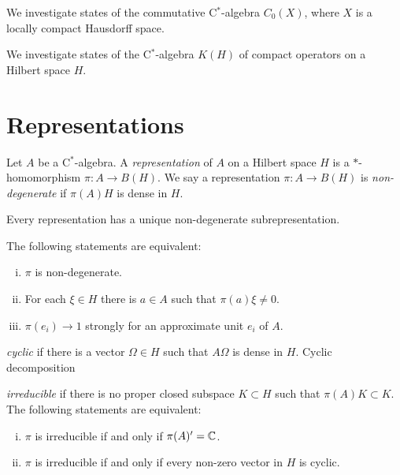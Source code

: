 \documentclass{../../large}
\begin{document}
\begin{prb}
We investigate states of the commutative C$^*$-algebra $C_0(X)$, where $X$ is a locally compact Hausdorff space.
\end{prb}

\begin{prb}
We investigate states of the C$^*$-algebra $K(H)$ of compact operators on a Hilbert space $H$.
\end{prb}

\section{Representations}


\begin{prb}
Let $A$ be a C$^*$-algebra.
A \emph{representation} of $A$ on a Hilbert space $H$ is a $*$-homomorphism $\pi:A\to B(H)$.
We say a representation $\pi:A\to B(H)$ is \emph{non-degenerate} if $\pi(A)H$ is dense in $H$.
\begin{parts}
\item Every representation has a unique non-degenerate subrepresentation.
\item The following statements are equivalent:
\begin{enumerate}[(i)]
\item $\pi$ is non-degenerate.
\item For each $\xi\in H$ there is $a\in A$ such that $\pi(a)\xi\ne0$.
\item $\pi(e_i)\to1$ strongly for an approximate unit $e_i$ of $A$.
\end{enumerate}
\end{parts}
\end{prb}

\begin{prb}
\emph{cyclic} if there is a vector $\Omega\in H$ such that $A\Omega$ is dense in $H$.
Cyclic decomposition
\end{prb}


\begin{prb}
\emph{irreducible} if there is no proper closed subspace $K\subset H$ such that $\pi(A)K\subset K$.
The following statements are equivalent:
\begin{enumerate}[(i)]
\item $\pi$ is irreducible if and only if $\pi(A)'=\mathbb{C}$.
\item $\pi$ is irreducible if and only if every non-zero vector in $H$ is cyclic.
\end{enumerate}
\end{prb}
\end{document}
